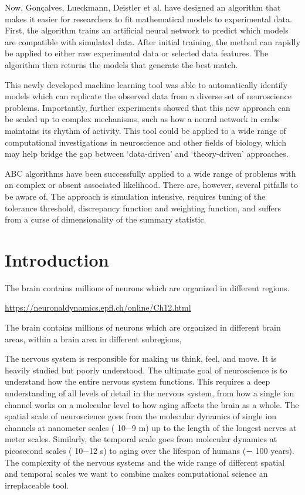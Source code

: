 Now, Gonçalves, Lueckmann, Deistler et al. have designed an algorithm that makes it easier for researchers to fit mathematical models to experimental data. First, the algorithm trains an artificial neural network to predict which models are compatible with simulated data. After initial training, the method can rapidly be applied to either raw experimental data or selected data features. The algorithm then returns the models that generate the best match.

This newly developed machine learning tool was able to automatically identify models which can replicate the observed data from a diverse set of neuroscience problems. Importantly, further experiments showed that this new approach can be scaled up to complex mechanisms, such as how a neural network in crabs maintains its rhythm of activity. This tool could be applied to a wide range of computational investigations in neuroscience and other fields of biology, which may help bridge the gap between ‘data-driven’ and ‘theory-driven’ approaches.

ABC algorithms have been successfully applied to a wide range of problems with an complex or absent associated likelihood. There are, however, several pitfalls to be aware of. The approach is simulation intensive, requires tuning of the tolerance threshold, discrepancy function and weighting function, and suffers from a curse of dimensionality of the summary statistic.  

\section{Introduction}

The brain contains millions of neurons which are organized in different regions. 

\url{https://neuronaldynamics.epfl.ch/online/Ch12.html}

The brain contains millions of neurons which are organized in different brain areas, within a brain area in different subregions,



The nervous system is responsible for making us think, feel, and move. It is heavily studied but poorly understood. The ultimate goal of neuroscience is to understand how the entire nervous system functions. This requires a deep understanding of all levels of detail in the nervous system, from how a single ion channel works on a molecular level to how aging affects the brain as a whole. The spatial scale of neuroscience goes from the molecular dynamics of single ion channels at nanometer scales ( 10−9 m) up to the length of the longest nerves at meter scales. Similarly, the temporal scale goes from molecular dynamics at picosecond scales ( 10−12 s) to aging over the lifespan of humans (∼ 100 years). The complexity of the nervous systems and the wide range of different spatial and temporal scales we want to combine makes computational science an irreplaceable tool.


